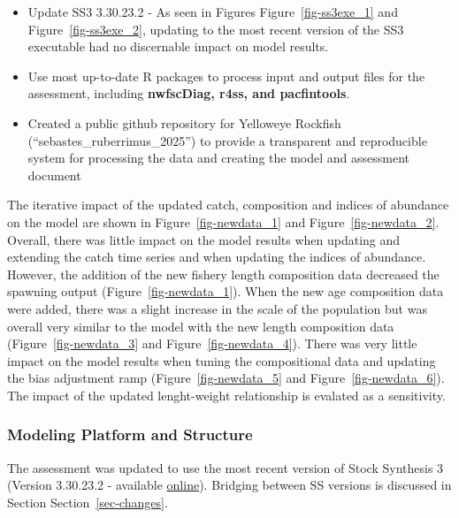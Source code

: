 \documentclass[
]{scrartcl}
\providecommand{\tightlist}{%
  \setlength{\itemsep}{0pt}\setlength{\parskip}{0pt}}\usepackage{longtable,booktabs,array}
\begin{document}
\begin{itemize}
  \begin{itemize}
  \tightlist
  \item
    Update SS3 3.30.23.2 - As seen in Figures Figure~\ref{fig-ss3exe_1}
    and Figure~\ref{fig-ss3exe_2}, updating to the most recent version
    of the SS3 executable had no discernable impact on model results.
  \item
    Use most up-to-date R packages to process input and output files for
    the assessment, including \textbf{nwfscDiag, r4ss, and pacfintools}.
  \item
    Created a public github repository for Yelloweye Rockfish
    (``sebastes\_ruberrimus\_2025'') to provide a transparent and
    reproducible system for processing the data and creating the model
    and assessment document
  \end{itemize}
\end{itemize}

The iterative impact of the updated catch, composition and indices of
abundance on the model are shown in Figure~\ref{fig-newdata_1} and
Figure~\ref{fig-newdata_2}. Overall, there was little impact on the
model results when updating and extending the catch time series and when
updating the indices of abundance. However, the addition of the new
fishery length composition data decreased the spawning output
(Figure~\ref{fig-newdata_1}). When the new age composition data were
added, there was a slight increase in the scale of the population but
was overall very similar to the model with the new length composition
data (Figure~\ref{fig-newdata_3} and Figure~\ref{fig-newdata_4}). There
was very little impact on the model results when tuning the
compositional data and updating the bias adjustment ramp
(Figure~\ref{fig-newdata_5} and Figure~\ref{fig-newdata_6}). The impact
of the updated lenght-weight relationship is evalated as a sensitivity.

\subsubsection{Modeling Platform and
Structure}\label{modeling-platform-and-structure}

The assessment was updated to use the most recent version of Stock
Synthesis 3 (Version 3.30.23.2 - available
\href{https://github.com/nmfs-ost/ss3-source-code/releases/tag/v3.30.23.2}{online}).
Bridging between SS versions is discussed in Section
Section~\ref{sec-changes}.
\end{document}
